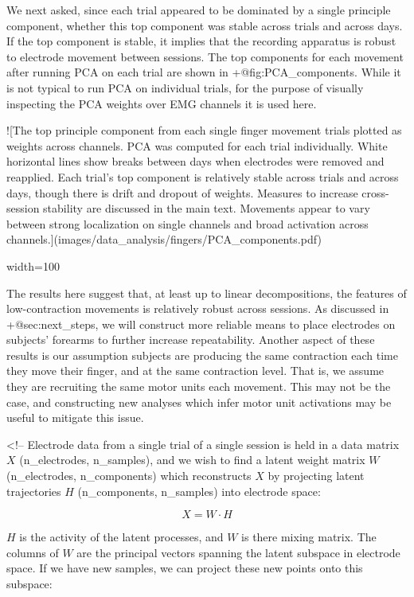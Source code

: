 \documentclass[../main.tex]{subfiles}
\begin{document}
{{{{{We next asked, since each trial appeared to be dominated by a single principle component, whether this top component was stable across trials and across days. If the top component is stable, it implies that the recording apparatus is robust to electrode movement between sessions. The top components for each movement after running PCA on each trial are shown in {+@fig:PCA_components}. While it is not typical to run PCA on individual trials, for the purpose of visually inspecting the PCA weights over EMG channels it is used here.

![The top principle component from each single finger movement trials plotted as weights across channels. PCA was computed for each trial individually. White horizontal lines show breaks between days when electrodes were removed and reapplied. Each trial's top component is relatively stable across trials and across days, though there is drift and dropout of weights. Measures to increase cross-session stability are discussed in the main text. Movements appear to vary between strong localization on single channels and broad activation across channels.](images/data_analysis/fingers/PCA_components.pdf){width=100%


The results here suggest that, at least up to linear decompositions, the features of low-contraction movements is relatively robust across sessions. As discussed in {+@sec:next_steps}, we will construct more reliable means to place electrodes on subjects' forearms to further increase repeatability. Another aspect of these results is our assumption subjects are producing the same contraction each time they move their finger, and at the same contraction level. That is, we assume they are recruiting the same motor units each movement. This may not be the case, and constructing new analyses which infer motor unit activations may be useful to mitigate this issue.

<!-- Electrode data from a single trial of a single session is held in a data matrix $X$ (n_electrodes, n_samples), and we wish to find a latent weight matrix $W$ (n_electrodes, n_components) which reconstructs $X$ by projecting latent trajectories $H$ (n_components, n_samples) into electrode space:

$$
X = W\cdot{H}
$$

$H$ is the activity of the latent processes, and $W$ is there mixing matrix. The columns of $W$ are the principal vectors spanning the latent subspace in electrode space. If we have new samples, we can project these new points onto this subspace:

}}}}}}
\end{document}
